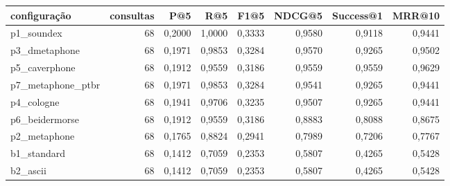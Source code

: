 \begin{tabular}{lrrrrrrr}
\hline
configuração & consultas & P@5 & R@5 & F1@5 & NDCG@5 & Success@1 & MRR@10 \\
\hline
p1\_soundex & 68 & 0,2000 & 1,0000 & 0,3333 & 0,9580 & 0,9118 & 0,9441 \\
p3\_dmetaphone & 68 & 0,1971 & 0,9853 & 0,3284 & 0,9570 & 0,9265 & 0,9502 \\
p5\_caverphone & 68 & 0,1912 & 0,9559 & 0,3186 & 0,9559 & 0,9559 & 0,9629 \\
p7\_metaphone\_ptbr & 68 & 0,1971 & 0,9853 & 0,3284 & 0,9541 & 0,9265 & 0,9441 \\
p4\_cologne & 68 & 0,1941 & 0,9706 & 0,3235 & 0,9507 & 0,9265 & 0,9441 \\
p6\_beidermorse & 68 & 0,1912 & 0,9559 & 0,3186 & 0,8883 & 0,8088 & 0,8675 \\
p2\_metaphone & 68 & 0,1765 & 0,8824 & 0,2941 & 0,7989 & 0,7206 & 0,7767 \\
b1\_standard & 68 & 0,1412 & 0,7059 & 0,2353 & 0,5807 & 0,4265 & 0,5428 \\
b2\_ascii & 68 & 0,1412 & 0,7059 & 0,2353 & 0,5807 & 0,4265 & 0,5428 \\
\hline
\end{tabular}